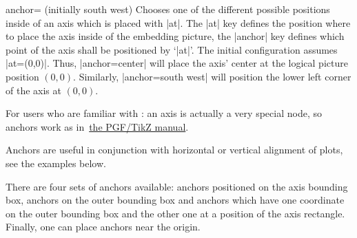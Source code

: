 \begin{pgfplotskey}{anchor= (initially south west)}
\label{option:anchor}
    Chooses one of the different possible positions inside of an axis which is
    placed with |at|. The |at| key defines the position where to place the axis
    inside of the embedding picture, the |anchor| key defines which point of
    the axis shall be positioned by `|at|'. The initial configuration assumes
    |at={(0,0)}|. Thus, |anchor=center| will place the axis' center at the
    logical picture position $(0,0)$. Similarly, |anchor=south west| will
    position the lower left corner of the axis at $(0,0)$.

    For users who are familiar with \Tikz{}: an axis is actually a very special
    node, so anchors work as in~\href{https://tikz.dev/}{the PGF/TikZ manual}.

    Anchors are useful in conjunction with horizontal or vertical alignment of
    plots, see the examples below.

    There are four sets of anchors available: anchors positioned on the axis
    bounding box, anchors on the outer bounding box and anchors which have one
    coordinate on the outer bounding box and the other one at a position of the
    axis rectangle. Finally, one can place anchors near the origin.


\end{pgfplotskey}
